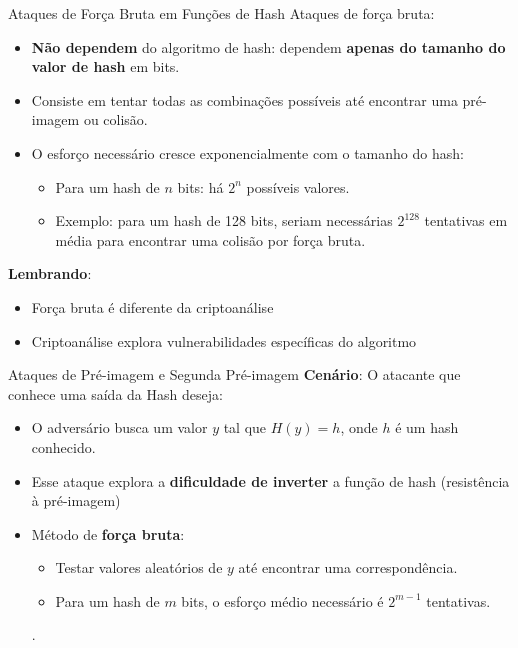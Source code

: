 \begin{frame}{Ataques de Força Bruta em Funções de Hash}
    Ataques de força bruta:
    \begin{itemize}
        \item  \textbf{Não dependem} do algoritmo de hash: dependem \textbf{apenas do tamanho do valor de hash} em bits.
        \item Consiste em tentar todas as combinações possíveis até encontrar uma pré-imagem ou colisão.
        \item O esforço necessário cresce exponencialmente com o tamanho do hash:
              \begin{itemize}
                  \item Para um hash de \(n\) bits: há \(2^n\) possíveis valores.
                  \item Exemplo: para um hash de 128 bits, seriam necessárias \(2^{128}\) tentativas em média para encontrar uma colisão por força bruta.
              \end{itemize}
    \end{itemize}

    \textbf{Lembrando}:
    \begin{itemize}
        \item Força bruta é diferente da criptoanálise
        \item Criptoanálise explora vulnerabilidades específicas do algoritmo
    \end{itemize}
\end{frame}
\begin{frame}{Ataques de Pré-imagem e Segunda Pré-imagem}
    \textbf{Cenário}: O atacante que conhece uma saída da Hash deseja:
    \begin{itemize}
        \item O adversário busca um valor \(y\) tal que \(H(y) = h\), onde \(h\) é um hash conhecido.
        \item Esse ataque explora a \textbf{dificuldade de inverter} a função de hash (resistência à pré-imagem)
        \item Método de \textbf{força bruta}:
              \begin{itemize}
                  \item Testar valores aleatórios de \(y\) até encontrar uma correspondência.
                  \item Para um hash de \(m\) bits, o esforço médio necessário é \(2^{m-1}\) tentativas.
              \end{itemize}
              .
    \end{itemize}
\end{frame}
